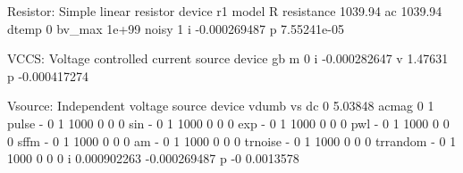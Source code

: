  Resistor: Simple linear resistor
     device                    r1
      model                     R
 resistance               1039.94
         ac               1039.94
      dtemp                     0
     bv_max                 1e+99
      noisy                     1
          i          -0.000269487
          p           7.55241e-05

 VCCS: Voltage controlled current source
     device                    gb
          m                     0
          i          -0.000282647
          v               1.47631
          p          -0.000417274

 Vsource: Independent voltage source
     device                 vdumb                    vs
         dc                     0               5.03848
      acmag                     0                     1
      pulse         -                     0
                                          1
                                       1000
                                          0
                                          0
                                          0
        sin         -                     0
                                          1
                                       1000
                                          0
                                          0
                                          0
        exp         -                     0
                                          1
                                       1000
                                          0
                                          0
                                          0
        pwl         -                     0
                                          1
                                       1000
                                          0
                                          0
                                          0
       sffm         -                     0
                                          1
                                       1000
                                          0
                                          0
                                          0
         am         -                     0
                                          1
                                       1000
                                          0
                                          0
                                          0
    trnoise         -                     0
                                          1
                                       1000
                                          0
                                          0
                                          0
   trrandom         -                     0
                                          1
                                       1000
                                          0
                                          0
                                          0
          i           0.000902263          -0.000269487
          p                    -0             0.0013578


